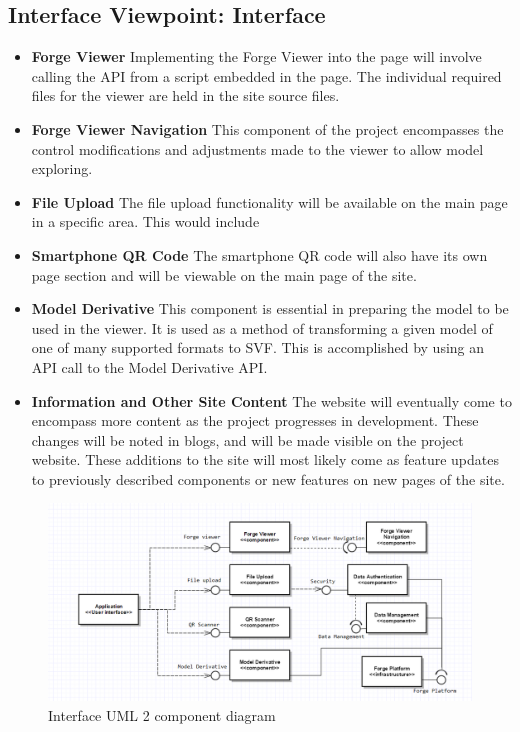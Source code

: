 \documentclass[letterpaper, 10pt, draftclsnofoot, compsoc, onecolumn]{IEEEtran}
\begin{document}
\subsection{Interface Viewpoint: Interface}
\begin{itemize}
	 \item[]\textbf{Forge Viewer} Implementing the Forge Viewer into the page will involve calling the API from a script embedded in the page. The individual required files for the viewer are held in the site source files.
	
	\item[]\textbf{Forge Viewer Navigation} This component of the project encompasses the control modifications and adjustments made to the viewer to allow model exploring.
	 
	\item[]\textbf{File Upload} The file upload functionality will be available on the main page in a specific area. This would include 
	
	\item[]\textbf{Smartphone QR Code}  The smartphone QR code will also have its own page section and will be viewable on the main page of the site.
	
	\item[]\textbf{Model Derivative} This component is essential in preparing the model to be used in the viewer. It is used as a method of transforming a given model of one of many supported formats to SVF. This is accomplished by using an API call to the Model Derivative API.
	
	\item[]\textbf{Information and Other Site Content} The website will eventually come to encompass more content as the project progresses in development. These changes will be noted in blogs, and will be made visible on the project website. These additions to the site will most likely come as feature updates to previously described components or new features on new pages of the site.	
\end{itemize}

\begin{figure}[ht]
	\includegraphics[scale=0.55]{WebInterface.png}
	\caption{Interface UML 2 component diagram}
\end{figure}
\end{document}
